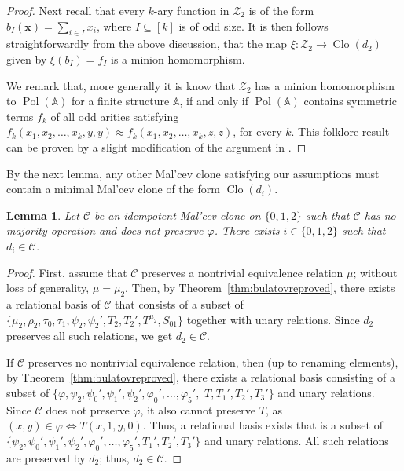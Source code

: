 \documentclass[12pt]{amsart}
\newtheorem{lemma}[theorem]{Lemma}
\theoremstyle{definition}
\theoremstyle{definition}
\newcommand{\clo}[1]{\mathcal{#1}}
\DeclareMathOperator{\Pol}{Pol}
\DeclareMathOperator{\Clo}{Clo}
\begin{document}
\begin{proof}
Next recall that every $k$-ary function in $\clo{Z}_2$ is of the form $b_I(\boldsymbol{x}) = \sum_{i\in I} x_i$, where $I \subseteq [k]$ is of odd size. It is then follows straightforwardly from the above discussion, that the map $\xi\colon \clo{Z}_2 \to \Clo(d_2)$ given by $\xi(b_I) = f_I$ is a minion homomorphism.

We remark that, more generally it is know that $\clo{Z}_2$ has a minion homomorphism to $\Pol(\mathbb A)$ for a finite structure $\mathbb A$, if and only if $\Pol(\mathbb A)$ contains symmetric terms $f_k$ of all odd arities satisfying $f_{k}(x_1,x_2,\ldots,x_k,y,y) \approx f_k(x_1,x_2,\ldots,x_k,z,z)$, for every $k$. This folklore result can be proven by a slight modification of the argument in \cite[Theorem 7.19.]{jakubPCSP}.

\end{proof}

By the next lemma, any other Mal'cev clone satisfying our assumptions must contain a minimal Mal'cev clone of the form $\Clo(d_i)$.

\begin{lemma}\label{lemma:algebras_not_sdmeet_di}
Let $\clo{C}$ be an idempotent Mal'cev clone on $\{0,1,2\}$ such that $\clo{C}$ has no majority operation and does not preserve $\varphi$. There exists $i\in \{0,1,2\}$ such that $d_i\in \clo{C}$.
\end{lemma}
\begin{proof}
First, assume that $\clo{C}$ preserves a nontrivial equivalence relation $\mu$; without loss of generality, $\mu = \mu_2$. Then, by Theorem~\ref{thm:bulatovreproved}, there exists a relational basis of $\clo{C}$ that consists of a subset of 
$\{\mu_2, \rho_2, \tau_0,\tau_1, \psi_2, \psi_2' ,T_2,T_2',T^{\mu_2}, S_{01} \}$ together with unary relations. Since $d_2$ preserves all such relations, we get $d_2\in \clo{C}$.

If $\clo{C}$ preserves no nontrivial equivalence relation, then (up to renaming elements), by Theorem~\ref{thm:bulatovreproved}, there exists a relational basis consisting of a subset of 
$\{\varphi, \psi_2, \psi_0', \psi_1', \psi_2', \varphi_0', \ldots, \varphi_5',$ $ T,T_1',T_2',T_3'\}$ and unary relations. 
Since $\clo{C}$ does not preserve $\varphi$, it also cannot preserve $T$, as $(x,y) \in \varphi \Leftrightarrow T(x,1,y,0)$. Thus, 
a relational basis exists that is a subset of  $\{\psi_2, \psi_0', \psi_1', \psi_2', \varphi_0', \ldots, \varphi_5',T_1',T_2',T_3'\}$ and unary relations. All such relations are preserved by $d_2$; thus, $d_2 \in \clo{C}$.
\end{proof}
\end{document}

